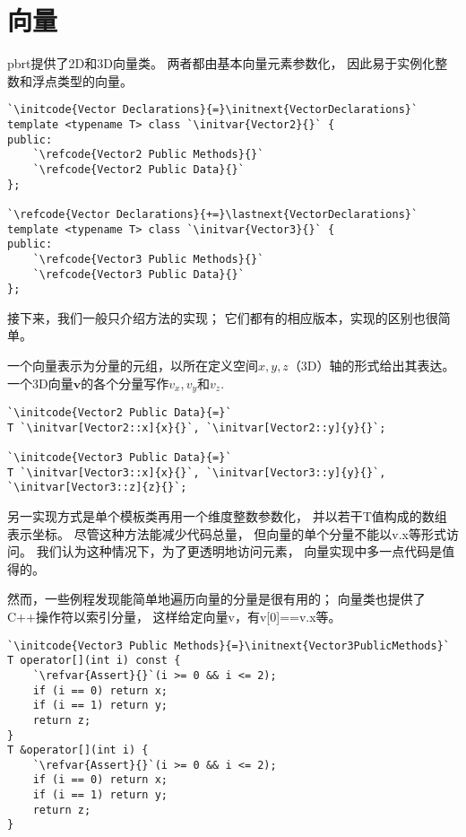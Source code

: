 \section{向量}\label{sec:向量}

pbrt提供了2D和3D向量类。
两者都由基本向量元素参数化，
因此易于实例化整数和浮点类型的向量。

\begin{lstlisting}
`\initcode{Vector Declarations}{=}\initnext{VectorDeclarations}`
template <typename T> class `\initvar{Vector2}{}` {
public:
    `\refcode{Vector2 Public Methods}{}`
    `\refcode{Vector2 Public Data}{}`
};

`\refcode{Vector Declarations}{+=}\lastnext{VectorDeclarations}`
template <typename T> class `\initvar{Vector3}{}` {
public:
    `\refcode{Vector3 Public Methods}{}`
    `\refcode{Vector3 Public Data}{}`
};
\end{lstlisting}

接下来，我们一般只介绍方法的实现；
它们都有的相应版本，实现的区别也很简单。

一个向量表示为分量的元组，以所在定义空间$x,y,z$（3D）轴的形式给出其表达。
一个3D向量$\bm v$的各个分量写作$v_x,v_y$和$v_z$.

\begin{lstlisting}
`\initcode{Vector2 Public Data}{=}`
T `\initvar[Vector2::x]{x}{}`, `\initvar[Vector2::y]{y}{}`;

`\initcode{Vector3 Public Data}{=}`
T `\initvar[Vector3::x]{x}{}`, `\initvar[Vector3::y]{y}{}`, `\initvar[Vector3::z]{z}{}`;
\end{lstlisting}

另一实现方式是单个模板类再用一个维度整数参数化，
并以若干{\ttfamily T}值构成的数组表示坐标。
尽管这种方法能减少代码总量，
但向量的单个分量不能以{\ttfamily v.x}等形式访问。
我们认为这种情况下，为了更透明地访问元素，
向量实现中多一点代码是值得的。

然而，一些例程发现能简单地遍历向量的分量是很有用的；
向量类也提供了C++操作符以索引分量，
这样给定向量{\ttfamily v}，有{\ttfamily v[0]==v.x}等。
\begin{lstlisting}
`\initcode{Vector3 Public Methods}{=}\initnext{Vector3PublicMethods}`
T operator[](int i) const { 
    `\refvar{Assert}{}`(i >= 0 && i <= 2);
    if (i == 0) return x;
    if (i == 1) return y;
    return z;
}
T &operator[](int i) { 
    `\refvar{Assert}{}`(i >= 0 && i <= 2);
    if (i == 0) return x;
    if (i == 1) return y;
    return z;
}
\end{lstlisting}

